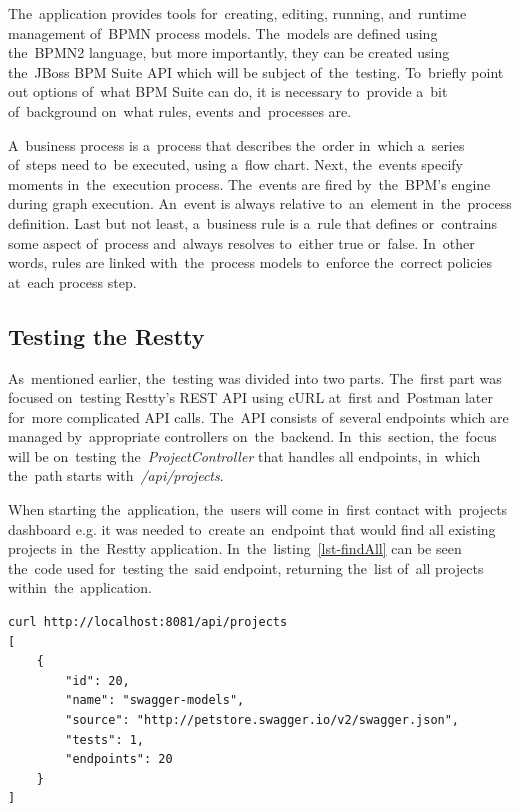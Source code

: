 The~application provides tools for~creating, editing, running, and~runtime management of~BPMN process models. The~models are defined
using the~BPMN2 language, but more importantly, they can be created using the~JBoss BPM Suite API which will be subject of~the~testing.
To~briefly point out options of~what BPM Suite can do, it is necessary to~provide a~bit of~background on~what rules, events
and~processes are.

A~business process is a~process that describes the~order in~which a~series of~steps need to~be executed, using a~flow chart. Next, the~events
specify moments in~the~execution process. The~events are fired by~the~BPM's engine during graph execution. An~event is always relative to~an~element
in~the~process definition. Last but not least, a~business rule is a~rule that defines or~contrains some aspect of~process and~always resolves to~either
true or~false. In~other words, rules are linked with~the~process models to~enforce the~correct policies at~each process step.


\subsection{Testing the Restty}
As~mentioned earlier, the~testing was divided into two parts. The~first part was focused on~testing Restty's REST API using
cURL at~first and~Postman later for~more complicated API calls. The~API consists of~several endpoints which are managed
by~appropriate controllers on~the~backend. In~this~section, the~focus will be on~testing the~\textit{ProjectController}
that handles all endpoints, in~which the~path starts with~\textit{/api/projects}.

When starting the~application, the~users will come in~first contact with~projects dashboard e.g. it was needed to~create an~endpoint
that would find all existing projects in~the~Restty application. In~the~listing~\ref{lst-findAll} can be seen the~code used for~testing
the~said endpoint, returning the~list of~all projects within~the~application. 

\vspace{1mm}
\begin{lstlisting}[caption=Testing the~\textit{/api/projects} endpoint using cURL.,
style=dp-default,label=lst-findAll]
curl http://localhost:8081/api/projects
[
	{
		"id": 20,
		"name": "swagger-models",
		"source": "http://petstore.swagger.io/v2/swagger.json",
		"tests": 1,
		"endpoints": 20
	}
]
\end{lstlisting}

